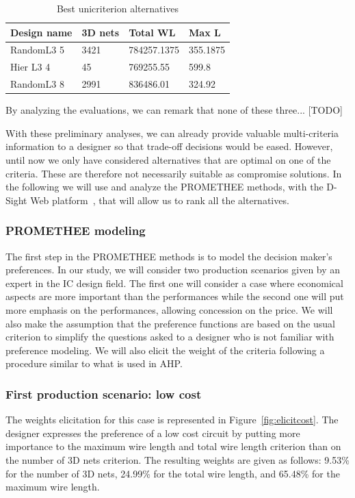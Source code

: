\documentclass{svmult}
\begin{document}
\begin{table}[h!]
    \begin{center}
        \caption{Best unicriterion alternatives}
        \label{tab:bestunicritalt}
        \begin{tabular}{p{2.3cm}p{1.5cm}p{2cm}p{1.3cm}}
            \hline
            Design name & 3D nets & Total WL & Max L\\
            \hline
            RandomL3 5 & 3421 & 784257.1375 & 355.1875 \\
            Hier L3 4 & 45 & 769255.55 & 599.8 \\
            RandomL3 8 & 2991 & 836486.01 & 324.92 \\
            \hline
        \end{tabular}
    \end{center}
\end{table}

By analyzing the evaluations, we can remark that none of these three... [TODO]

With these preliminary analyses, we can already provide valuable multi-criteria information to a designer so that trade-off decisions would be eased. However, until now we only have considered alternatives that are optimal on one of the criteria. These are therefore not necessarily suitable as compromise solutions. In the following we will use and analyze the PROMETHEE methods, with the D-Sight Web platform~\cite{dsightweb,Hayez}, that will allow us to rank all the alternatives.

\subsubsection{PROMETHEE modeling}
The first step in the PROMETHEE methods is to model the decision maker's preferences. In our study, we will consider two production scenarios given by an expert in the IC design field. The first one will consider a case where economical aspects are more important than the performances while the second one will put more emphasis on the performances, allowing concession on the price. We will also make the assumption that the preference functions are based on the usual criterion to simplify the questions asked to a designer who is not familiar with preference modeling. We will also elicit the weight of the criteria following a procedure similar to what is used in AHP.

\subsubsection*{First production scenario: low cost}
The weights elicitation for this case is represented in Figure~\ref{fig:elicitcost}. The designer expresses the preference of a low cost circuit by putting more importance to the maximum wire length and total wire length criterion than on the number of 3D nets criterion. The resulting weights are given as follows: 9.53\% for the number of 3D nets, 24.99\% for the total wire length, and 65.48\% for the maximum wire length.
\end{document}
